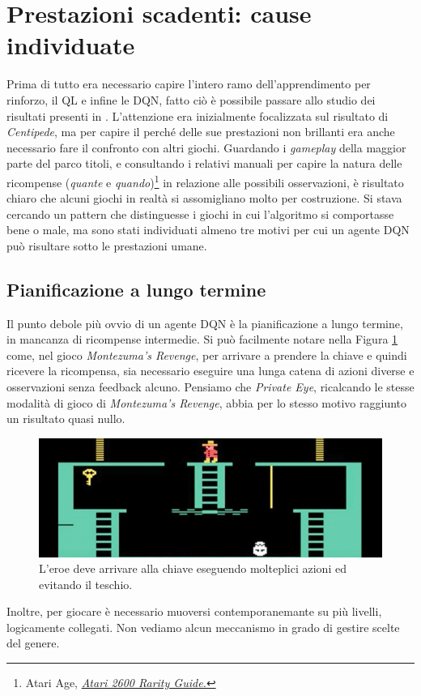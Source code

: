 \documentclass[twoside,twocolumn,10pt]{extarticle}
\theoremstyle{definition}
\begin{document}
\section{Prestazioni scadenti: cause individuate}
	Prima di tutto era necessario capire l'intero ramo dell'apprendimento per rinforzo, il QL e infine le DQN, fatto ciò è possibile passare allo studio dei risultati presenti in \cite{bib:dqn}. L'attenzione era inizialmente focalizzata sul risultato di \textit{Centipede}, ma per capire il perché delle sue prestazioni non brillanti era anche necessario fare il confronto con altri giochi. Guardando i \textit{gameplay} della maggior parte del parco titoli, e consultando i relativi manuali per capire la natura delle ricompense (\textit{quante} e \textit{quando})\footnote{Atari Age, \emph{\href{https://atariage.com/software_search.php?SystemID=2600}{Atari 2600 Rarity Guide.}}} in relazione alle possibili osservazioni, è risultato chiaro che alcuni giochi in realtà si assomigliano molto per costruzione. Si stava cercando un pattern che distinguesse i giochi in cui l'algoritmo si comportasse bene o male, ma sono stati individuati almeno tre motivi per cui un agente DQN può risultare sotto le prestazioni umane.

	\subsection{Pianificazione a lungo termine}
		Il punto debole più ovvio di un agente DQN è la pianificazione a lungo termine, in mancanza di ricompense intermedie. Si può facilmente notare nella Figura \ref{fig:montezuma} come, nel gioco \textit{Montezuma's Revenge}, per arrivare a prendere la chiave e quindi ricevere la ricompensa, sia necessario eseguire una lunga catena di azioni diverse e osservazioni senza feedback alcuno. Pensiamo che \textit{Private Eye}, ricalcando le stesse modalità di gioco di \textit{Montezuma's Revenge}, abbia per lo stesso motivo raggiunto un risultato quasi nullo.
		\begin{figure}[ht!]
			\centering
			\includegraphics[scale=.31]{images/montezuma.jpg}
			\caption{L'eroe deve arrivare alla chiave eseguendo molteplici azioni ed evitando il teschio.}
			\label{fig:montezuma}
		\end{figure}
		Inoltre, per giocare è necessario muoversi contemporanemante su più livelli, logicamente collegati. Non vediamo alcun meccanismo in grado di gestire scelte del genere.
		
\end{document}
